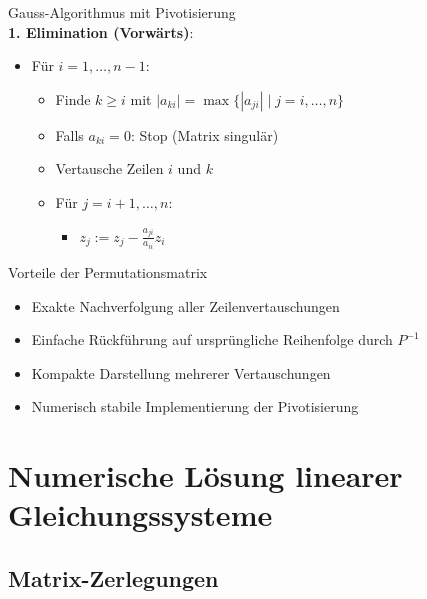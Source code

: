 \begin{KR}{Gauss-Algorithmus mit Pivotisierung}\\
\textbf{1. Elimination (Vorwärts)}:
\begin{itemize}
    \item Für $i=1,\ldots,n-1$:
    \begin{itemize}
    \item Finde $k \geq i$ mit $|a_{ki}| = \max\{|a_{ji}| \mid j = i,\ldots,n\}$
    \item Falls $a_{ki} = 0$: Stop (Matrix singulär)
    \item Vertausche Zeilen $i$ und $k$
    \item Für $j=i+1,\ldots,n$:
    \begin{itemize}
    \item $z_j := z_j - \frac{a_{ji}}{a_{ii}}z_i$
    \end{itemize}
    \end{itemize}
\end{itemize}
\vspace{-2mm}
\end{KR}

\begin{concept}{Vorteile der Permutationsmatrix}
    \begin{itemize}
        \item Exakte Nachverfolgung aller Zeilenvertauschungen
        \item Einfache Rückführung auf ursprüngliche Reihenfolge durch $P^{-1}$
        \item Kompakte Darstellung mehrerer Vertauschungen
        \item Numerisch stabile Implementierung der Pivotisierung
    \end{itemize}
\end{concept}





\section{Numerische Lösung linearer Gleichungssysteme}

\subsection{Matrix-Zerlegungen}

